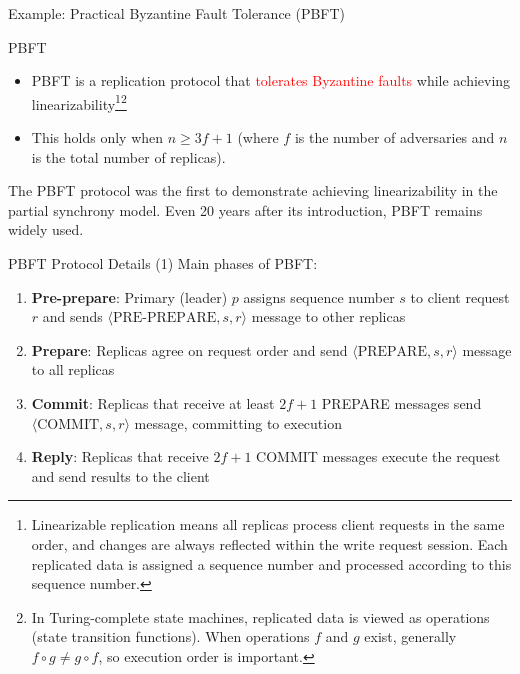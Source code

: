 \documentclass[aspectratio=169,10pt]{beamer}
\newenvironment{proofblock}[1][]
{\begin{block}{#1}\vspace{0.5em}}
{\vspace{0.5em}\end{block}}
\begin{document}
\begin{frame}{Example: Practical Byzantine Fault Tolerance (PBFT)}
\begin{proofblock}[PBFT]
\begin{itemize}
    \item PBFT is a replication protocol that \textcolor{red}{tolerates Byzantine faults} while achieving linearizability\footnote{Linearizable replication means all replicas process client requests in the same order, and changes are always reflected within the write request session. Each replicated data is assigned a sequence number and processed according to this sequence number.}\footnote{In Turing-complete state machines, replicated data is viewed as operations (state transition functions). When operations $f$ and $g$ exist, generally $f \circ g \neq g \circ f$, so execution order is important.}
    \item This holds only when $n \geq 3f+1$ (where $f$ is the number of adversaries and $n$ is the total number of replicas).
\end{itemize}
\end{proofblock}

The PBFT protocol was the first to demonstrate achieving linearizability in the partial synchrony model.
Even 20 years after its introduction, PBFT remains widely used.


\end{frame}

\begin{frame}{PBFT Protocol Details (1)}
Main phases of PBFT:
\vspace{0.5em}
\begin{enumerate}
    \item \textbf{Pre-prepare}: Primary (leader) $p$ assigns sequence number $s$ to client request $r$ and sends $\langle \text{PRE-PREPARE}, s, r \rangle$ message to other replicas
    
    \item \textbf{Prepare}: Replicas agree on request order and send $\langle \text{PREPARE}, s, r \rangle$ message to all replicas
    
    \item \textbf{Commit}: Replicas that receive at least $2f+1$ PREPARE messages send $\langle \text{COMMIT}, s, r \rangle$ message, committing to execution
    
    \item \textbf{Reply}: Replicas that receive $2f+1$ COMMIT messages execute the request and send results to the client
\end{enumerate}
\end{frame}
\end{document}
